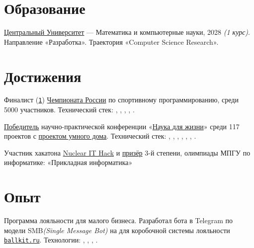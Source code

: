 \documentclass[margin,line]{resume}
\begin{document}
\begin{resume}
  \section{\mysidestyle Образование}
  \href{https://centraluniversity.ru/}{Центральный Университет} —
  Математика и компьютерные науки, 2028 \textit{(1 курс)}.
  Направление «Разработка». Траектория «Computer Science Research».

  \section{\mysidestyle Достижения}
  Финалист
  (\href{https://alchemmist.github.io/CV/attachments/russian-chemp-final.pdf}{\texttt{1}})
  \href{https://events.fsp-russia.com/championship}{Чемпионата
  России} по спортивному
  программированию, среди 5000 участников. Технический стек:
  , ,
  ,
  ,
  .

  \href{https://alchemmist.github.io/CV/attachments/scince-for-life-win.pdf}{Победитель}
  научно-практической конференции
  «\href{https://conf.profil.mos.ru/academ}{Наука для
  жизни}» среди 117 проектов с
  \href{https://github.com/smart-cab/}{проектом умного
  дома}. Технический стек: ,
  , , ,
  , , .

  Участник хакатона \href{https://nuclearhack.mephi.ru/}{Nuclear
  IT Hack} и
  \href{https://alchemmist.github.io/CV/attachments/informatics-olimpic.pdf}{призёр}
  3-й степени, олимпиады МПГУ по информатике: «Прикладная информатика»

  \section{\mysidestyle Опыт}\vspace{0.7mm}
  \begin{description}[leftmargin=0pt, itemindent=*, itemsep=8pt]
    \item[Ballkit:] Программа лояльности для малого бизнеса.
      Разработал бота в Telegram по модели SMB\textit{(Single Message Bot)} на
       для коробочной системы лояльности
      \href{https://ballkit.ru}{\texttt{ballkit.ru}}.
      Технологии:
      ,
      , ,
      .


\end{description}
\end{resume}
\end{document}
